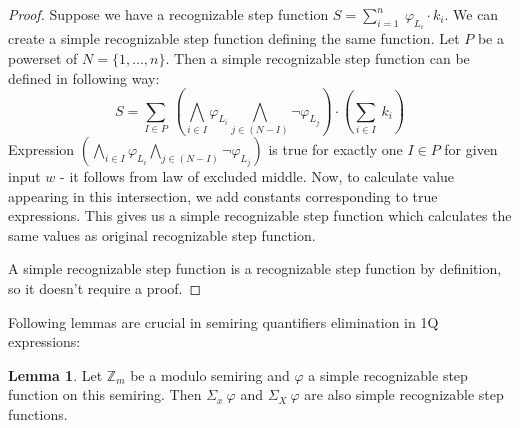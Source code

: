 \documentclass[12pt]{article}
\theoremstyle{definition}
\newtheorem{lemma}[theorem]{Lemma}
\begin{document}
\begin{proof}
    Suppose we have a recognizable step function $S = \sum_{i = 1}^{n} \ \varphi_{L_i} \cdot k_i$. We can create a simple recognizable step function defining the same function. Let $P$ be a powerset of $N = \{1,\ldots,n\}$. Then a simple recognizable step function can be defined in following way:
    $$S = \sum_{I \in P} \ (\bigwedge_{i \in I} \varphi_{L_i} \bigwedge_{j \in (N-I)} \neg \varphi_{L_j}) \cdot (\sum_{i \in I} \ k_i)$$
    Expression $(\bigwedge_{i \in I} \varphi_{L_i} \bigwedge_{j \in (N-I)} \neg \varphi_{L_j})$ is true for exactly one $I \in P$ for given input $w$ - it follows from law of excluded middle. Now, to calculate value appearing in this intersection, we add constants corresponding to true expressions. This gives us a simple recognizable step function which calculates the same values as original recognizable step function.

    A simple recognizable step function is a recognizable step function by definition, so it doesn't require a proof.
\end{proof}

Following lemmas are crucial in semiring quantifiers elimination in 1Q expressions:

\begin{lemma}
    \label{QuantElimAdd}
    Let $\mathbb{Z}_m$ be a modulo semiring and $\varphi$ a simple recognizable step function on this semiring. Then $\Sigma_x \ \varphi$ and $\Sigma_X \ \varphi$ are also simple recognizable step functions.
\end{lemma}
\end{document}
